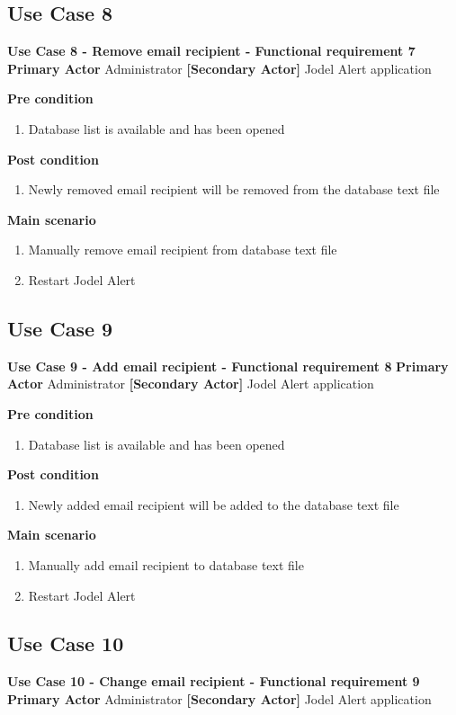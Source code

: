 \documentclass[a4paper,12pt]{article}
\begin{document}
\subsection{Use Case 8}
\textbf{Use Case 8 - Remove email recipient - Functional requirement 7}
\textbf{Primary Actor}
Administrator
\textbf{[Secondary Actor]}
Jodel Alert application

\textbf{Pre condition}
\begin{enumerate}
	\item Database list is available and has been opened
\end{enumerate}
\textbf{Post condition}
\begin{enumerate}
	\item Newly removed email recipient will be removed from the database text file
\end{enumerate}

\textbf{Main scenario}
\begin{enumerate}
	\item Manually remove email recipient from database text file
	\item Restart Jodel Alert
\end{enumerate}

\subsection{Use Case 9}
\textbf{Use Case 9 - Add email recipient - Functional requirement 8}
\textbf{Primary Actor}
Administrator
\textbf{[Secondary Actor]}
Jodel Alert application

\textbf{Pre condition}
\begin{enumerate}
	\item Database list is available and has been opened
\end{enumerate}
\textbf{Post condition}
\begin{enumerate}
	\item Newly added email recipient will be added to the database text file
\end{enumerate}

\textbf{Main scenario}
\begin{enumerate}
	\item Manually add email recipient to database text file
	\item Restart Jodel Alert
\end{enumerate}

\subsection{Use Case 10}
\textbf{Use Case 10 - Change email recipient - Functional requirement 9}
\textbf{Primary Actor}
Administrator
\textbf{[Secondary Actor]}
Jodel Alert application
\end{document}
